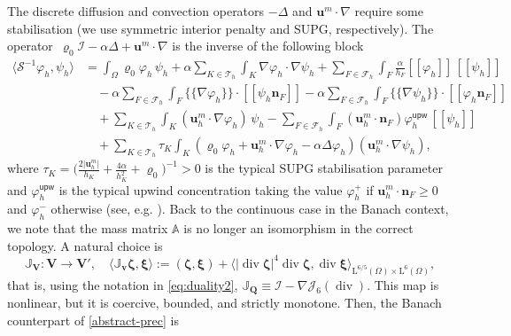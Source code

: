 \documentclass[11pt, reqno, a4paper, twoside]{article}
\newcommand{\bn}{\boldsymbol{n}}
\newcommand{\bu}{\boldsymbol{u}}
\newcommand{\bv}{\boldsymbol{v}}
\newcommand\bzeta{\boldsymbol{\zeta}}
\newcommand\bxi{\boldsymbol{\xi}}
\newcommand{\rL}{\mathrm{L}}
\newcommand{\bV}{\mathbf{V}}
\newcommand{\bQ}{\mathbf{Q}}
\newcommand{\bbA}{\mathbb{A}}
\newcommand{\bbJ}{\mathbb{J}}
\newcommand{\cJ}{\mathcal{J}}
\newcommand{\cI}{\mathcal{I}}
\newcommand{\cT}{\mathcal{T}}
\newcommand{\cS}{\mathcal{S}}
\newcommand\vdiv{\mathop{\mathrm{div}}\nolimits}
\numberwithin{equation}{section}
\numberwithin{remark}{section}
\numberwithin{figure}{section}
\numberwithin{table}{section}
\begin{document}
{
The discrete diffusion and convection operators $-\Delta$ and $\bu^m\cdot\nabla$ require some stabilisation (we use symmetric interior penalty and SUPG, respectively). The operator~$\varrho_0\cI-\alpha\Delta+\bu^m\cdot\nabla$ is the inverse of the following block
\begin{align} \label{eq:S-block-def} %
\nonumber \langle\cS^{-1}\varphi_h,\psi_h \rangle & =  \int_\Omega \varrho_0 \varphi_h\,\psi_h +  \alpha \sum_{K\in \cT_h} \int_K  \nabla \varphi_h \cdot \nabla \psi_h + \sum_{F\in \mathcal{F}_h}{\int_F} \frac{\alpha}{h_F} [\![\varphi_h]\!]\,[\![\psi_h]\!] \\
&  \quad - \alpha \sum_{F\in \mathcal{F}_h} \int_F  \{\!\{\nabla \varphi_h\}\!\}\cdot[\![\psi_h\bn_F]\!] - \alpha \sum_{F\in \mathcal{F}_h}{\int_F}  \{\!\{\nabla \psi_h\}\!\}\cdot[\![\varphi_h\bn_F]\!]  \nonumber \\
&  \quad 
+ 
\sum_{K\in \cT_h} \int_K (\bu_h^m\cdot \nabla \varphi_h)\,\psi_h 
- \sum_{F\in \mathcal{F}_h} \int_F (\bu_h^m \cdot \bn_F)\varphi_h^{\mathsf{upw}}\,[\![\psi_h]\!]
\nonumber \\
& \quad +  \sum_{K\in \cT_h}\tau_K \int_K (\varrho_0\varphi_h + \bu_h^m \cdot \nabla \varphi_h - \alpha \Delta \varphi_h)(\bu^{m}_h\cdot\nabla \psi_h), 
\end{align}
where 
$\tau_K = \bigl( \frac{2|\bu_h^m|}{h_K}+ \frac{4\alpha}{h_K^2} + \varrho_0 \bigr)^{-1} >0$ is the typical SUPG stabilisation parameter and 
$\varphi_h^{\mathsf{upw}}$ is the typical upwind concentration taking the value $\varphi_h^+$ if $\bu_h^m \cdot \bn_F \geq 0$ and $\varphi_h^-$ otherwise 
(see, e.g. \cite{franca1992stabilized}).
Back to the continuous case in  the Banach context, we note that the mass matrix $\bbA$ is no longer an isomorphism in the correct topology. A natural choice is 
\[ \bbJ_{\bV}: \bV \to \bV', \quad \langle \bbJ_{\bv}\bzeta,\bxi\rangle := (\bzeta,\bxi) + \langle |\vdiv\bzeta|^{4}\vdiv \bzeta, \vdiv \bxi\rangle_{\rL^{6/5}(\Omega)\times \rL^6(\Omega)}, \]
that is, using the notation in \eqref{eq:duality2}, $\bbJ_{\bQ} \equiv \cI - \nabla\cJ_6(\vdiv)$. This map is nonlinear, but it is coercive, bounded, and strictly monotone. Then, the Banach counterpart of \eqref{abstract-prec} is 
}
\end{document}
